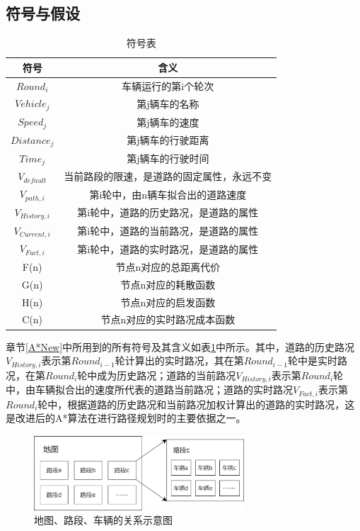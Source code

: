 \subsection{符号与假设}

\begin{table}[ht]
  \linespread{1.5}
  \centering
  \caption{符号表}\label{currentPathSymbols}
  \begin{tabular}{cc} 
  \toprule
    符号 & 含义 \\ 
  \hline
    $Round_i$ & 车辆运行的第i个轮次 \\
    $Vehicle_j$ & 第j辆车的名称 \\
    $Speed_j$ & 第j辆车的速度 \\
    $Distance_j$ & 第j辆车的行驶距离 \\
    $Time_j$ & 第j辆车的行驶时间 \\
    $V_{default}$ & 当前路段的限速，是道路的固定属性，永远不变 \\
    $V_{path,i}$ & 第i轮中，由n辆车拟合出的道路速度 \\ 
    $V_{History,i}$ & 第i轮中，道路的历史路况，是道路的属性 \\
    $V_{Current,i}$ & 第i轮中，道路的当前路况，是道路的属性 \\
    $V_{Fact,i}$ & 第i轮中，道路的实时路况，是道路的属性 \\
    F(n) & 节点n对应的总距离代价 \\
    G(n) & 节点n对应的耗散函数 \\
    H(n) & 节点n对应的启发函数 \\
    C(n) & 节点n对应的实时路况成本函数 \\
  \bottomrule
  \end{tabular}
\end{table}

章节\ref{A*New}中所用到的所有符号及其含义如表\ref{currentPathSymbols}中所示。其中，道路的历史路况$V_{History,i}$表示第$Round_{i-1}$轮计算出的实时路况，其在第$Round_{i-1}$轮中是实时路况，在第$Round_{i}$轮中成为历史路况；道路的当前路况$V_{History,i}$表示第$Round_{i}$轮中，由车辆拟合出的速度所代表的道路当前路况；道路的实时路况$V_{Fact,i}$表示第$Round_{i}$轮中，根据道路的历史路况和当前路况加权计算出的道路的实时路况，这是改进后的A*算法在进行路径规划时的主要依据之一。

\begin{figure}[ht]
  \centering
  \includegraphics[width=0.7\textwidth]{undergraduate-thesis/images/MapPathVehicle.png}
  \caption{地图、路段、车辆的关系示意图}
  \label{mappathvehicle} %
\end{figure}


